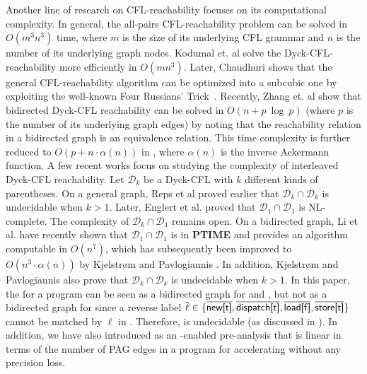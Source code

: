 Another line of research on CFL-reachability focuses on  its computational complexity. 
In general, the all-pairs CFL-reachability problem can be solved in $O(m^3n^3)$ time, 
where $m$ is the size of its underlying CFL grammar and $n$ is the number of its underlying
graph nodes.
Kodumal et. al \cite{kodumal2004set} solve the Dyck-CFL-reachability  
more efficiently in $O(mn^3)$. Later, Chaudhuri \cite{chaudhuri2008subcubic} shows that the
general CFL-reachability algorithm can be optimized into a subcubic one by exploiting the well-known Four Russians' Trick~\cite{kronrod1970economic}. Recently,
Zhang et. al \cite{zhang2013fast} show that  bidirected Dyck-CFL reachability can be solved in $O(n + p ~ \log ~ p)$  (where $p$ is the number of its underlying graph edges) by noting that the reachability relation in a bidirected graph is an equivalence relation. This time complexity is further reduced to $O(p + n \cdot \alpha(n))$ in \cite{chatterjee2017optimal}, where $\alpha(n)$ is the inverse Ackermann function. 
A few recent works focus on studying the complexity of interleaved Dyck-CFL reachability. Let $\mathcal{D}_k$ be a Dyck-CFL with $k$ different kinds of parentheses. On a general graph, Reps et al \cite{reps2000undecidability} proved earlier that $\mathcal{D}_k \cap \mathcal{D}_k$ is undecidable when $k > 1$. Later, Englert et al. \cite{englert2016reachability} proved that  $\mathcal{D}_1 \cap \mathcal{D}_1$ is NL-complete. The complexity of $\mathcal{D}_k \cap \mathcal{D}_1$ remains open. On a bidirected graph, Li et al. \cite{li2021complexity} have recently shown that $\mathcal{D}_1 \cap \mathcal{D}_1$ is in \textbf{PTIME} and provides an algorithm computable in $O(n^7)$, which has
subsequently been improved to $O(n^3\cdot \alpha(n))$ by Kjelstr\o{}m and Pavlogiannis \cite{kjelstrom2022decidability}. In addition, Kjelstr\o{}m and Pavlogiannis \cite{kjelstrom2022decidability} also prove that $\mathcal{D}_k \cap \mathcal{D}_k$ is undecidable when $k > 1$. In this paper, the \pag for a program can be seen as a bidirected graph for \LC and \LR, but not
as a bidirected graph for \LF since a reverse label $\overline{\ell} \in \{\overline{\textsf{new[t]}}, \overline{\textsf{dispatch[t]}}, \overline{\textsf{load[f]}}, \overline{\textsf{store[t]}}\}$ cannot be matched by $\ell$ in \LF. Therefore, \LFCR is undecidable (as discussed in ).
In addition, we have also introduced \tool as an \LFCR-enabled pre-analysis 
that is linear in terms of the number of
PAG edges in a program for accelerating  without any precision loss. 

 

